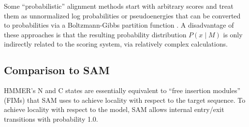 \documentclass[11pt]{article}
\begin{document}

Some ``probabilistic'' alignment methods start with arbitrary scores
and treat them as unnormalized log probabilities or pseudoenergies
that can be converted to probabilities via a Boltzmann-Gibbs partition
function \citep{ZhangMarr95,BucherHofmann96,YuHwa01}. A disadvantage
of these approaches is that the resulting probability distribution
$P(x \mid M)$ is only indirectly related to the scoring system, via
relatively complex calculations.


\subsection{Comparison to SAM}

HMMER's N and C states are essentially equivalent to ``free insertion
modules'' (FIMs) that SAM uses to achieve locality with respect to the
target sequence. To achieve locality with respect to the model, SAM
allows internal entry/exit transitions with probability 1.0. 



\end{document}
